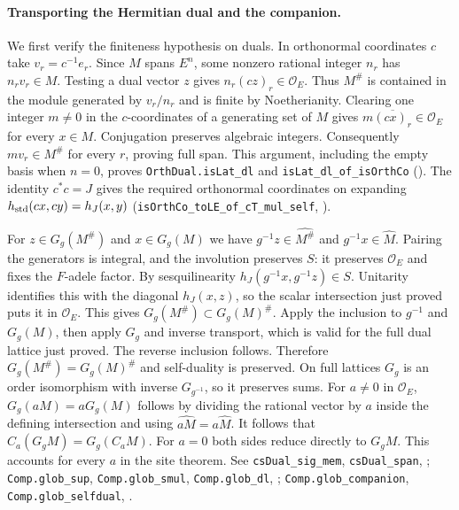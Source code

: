 \paragraph{Transporting the Hermitian dual and the companion.}\label{r15:site-dual}
We first verify the finiteness hypothesis on duals. In orthonormal
coordinates $c$ take $v_r=c^{-1}e_r$. Since $M$ spans $E^n$,
some nonzero rational integer $n_r$ has $n_r v_r\in M$. Testing a
dual vector $z$ gives $n_r(cz)_r\in\mathcal O_E$. Thus $M^\#$ is
contained in the module generated by $v_r/n_r$ and is finite by
Noetherianity. Clearing one integer $m\ne0$ in the $c$-coordinates
of a generating set of $M$ gives $m\overline{(cx)_r}\in\mathcal O_E$
for every $x\in M$. Conjugation preserves algebraic integers.
Consequently $m v_r\in M^\#$ for every $r$, proving full span.
This argument, including the empty basis when $n=0$, proves
\nolinkurl{OrthDual.isLat_dl} and \nolinkurl{isLat_dl_of_isOrthCo}
().
The identity $c^*c=J$ gives the required orthonormal coordinates on
expanding $h_{\rm std}(cx,cy)=h_J(x,y)$
(\nolinkurl{isOrthCo_toLE_of_cT_mul_self},
).

For $z\in G_g(M^\#)$ and $x\in G_g(M)$ we have
$g^{-1}z\in\widehat{M^\#}$ and $g^{-1}x\in\widehat M$.
Pairing the generators is integral, and the involution preserves $S$:
it preserves $\mathcal O_E$ and fixes the $F$-adele factor.
By sesquilinearity $h_J(g^{-1}x,g^{-1}z)\in S$.
Unitarity identifies this with the diagonal $h_J(x,z)$, so the scalar
intersection just proved puts it in $\mathcal O_E$. This gives
$G_g(M^\#)\subset G_g(M)^\#$. Apply the inclusion to $g^{-1}$ and
$G_g(M)$, then apply $G_g$ and inverse transport, which is valid for
the full dual lattice just proved. The reverse inclusion follows.
Therefore $G_g(M^\#)=G_g(M)^\#$ and self-duality is preserved.
On full lattices $G_g$ is an order isomorphism with inverse $G_{g^{-1}}$,
so it preserves sums. For $a\ne0$ in $\mathcal O_E$,
$G_g(aM)=aG_g(M)$ follows by dividing the rational vector by $a$ inside
the defining intersection and using $\widehat{aM}=a\widehat M$.
It follows that $C_a(G_gM)=G_g(C_aM)$. For $a=0$ both sides reduce
directly to $G_gM$. This accounts for every $a$ in the site theorem.
See \nolinkurl{csDual_sig_mem}, \nolinkurl{csDual_span},
;
\nolinkurl{Comp.glob_sup}, \nolinkurl{Comp.glob_smul}, \nolinkurl{Comp.glob_dl},
;
\nolinkurl{Comp.glob_companion}, \nolinkurl{Comp.glob_selfdual},
.

